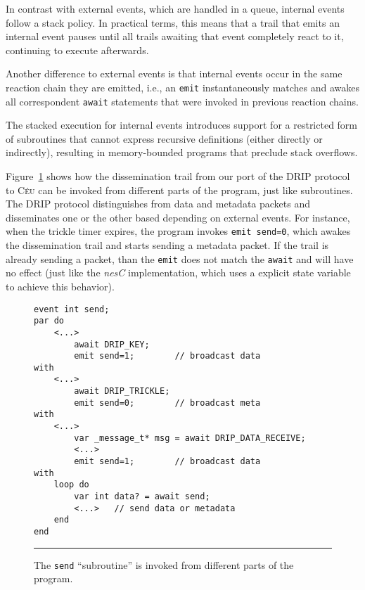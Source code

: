 \documentclass[10pt]{sensys-proc}
\newcommand{\CEU}{\textsc{C\'{e}u}\xspace}
\newcommand{\code}[1] {{\small{\texttt{#1}}}}
\begin{document}
In contrast with external events, which are handled in a queue, internal events 
follow a stack policy.
In practical terms, this means that a trail that emits an internal event pauses 
until all trails awaiting that event completely react to it, continuing to 
execute afterwards.

Another difference to external events is that internal events occur in the same 
reaction chain they are emitted, i.e., an \code{emit} instantaneously matches 
and awakes all correspondent \code{await} statements that were invoked in 
previous reaction chains.

The stacked execution for internal events introduces support for a restricted 
form of subroutines that cannot express recursive definitions (either directly 
or indirectly), resulting in memory-bounded programs that preclude stack 
overflows.

Figure~\ref{lst.func} shows how the dissemination trail from our port of the 
DRIP protocol to \CEU can be invoked from different parts of the program, just 
like subroutines.
The DRIP protocol distinguishes from data and metadata packets and disseminates 
one or the other based depending on external events.
For instance, when the trickle timer expires, the program invokes 
\code{emit~send=0}, which awakes the dissemination trail and starts sending a 
metadata packet.
If the trail is already sending a packet, than the \code{emit} does not match 
the \code{await} and will have no effect (just like the \emph{nesC} 
implementation, which uses a explicit state variable to achieve this behavior).


\begin{figure}[t]
{\small
\begin{verbatim}
event int send;
par do
    <...>
        await DRIP_KEY;
        emit send=1;        // broadcast data
with
    <...>
        await DRIP_TRICKLE;
        emit send=0;        // broadcast meta
with
    <...>
        var _message_t* msg = await DRIP_DATA_RECEIVE;
        <...>
        emit send=1;        // broadcast data
with
    loop do
        var int data? = await send;
        <...>   // send data or metadata
    end
end
\end{verbatim}
}
\rule{8.5cm}{0.37pt}
\caption{ The \code{send} ``subroutine'' is invoked from different parts of the 
program.
\label{lst.func}
}
\end{figure}
\end{document}
